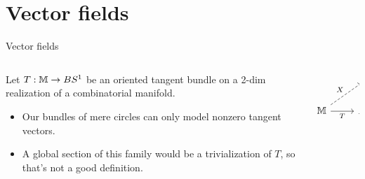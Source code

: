\section{Vector fields}

\begin{frame}{Vector fields}
\begin{columns}
\begin{column}{0.7\textwidth}
Let \( T:\mathbb{M}\to BS^1 \) be an oriented tangent bundle on a 2-dim realization of a combinatorial manifold.
\begin{itemize}
\item Our bundles of mere circles can only model \alert{nonzero} tangent vectors.
\item  A global section of this family would be a trivialization of \( T \), so that's not a good definition.
\end{itemize}
\quad\\~\\
\end{column}
\begin{column}{0.3\textwidth}
\[\begin{tikzcd}[ampersand replacement=\&]
  \& {*} \\
  \mm \& {BS^1}
  \arrow["{{S^1}}", from=1-2, to=2-2]
  \arrow["X", dashed, from=2-1, to=1-2]
  \arrow["T"', from=2-1, to=2-2]
\end{tikzcd}\]
\end{column}
\end{columns}
\end{frame}


